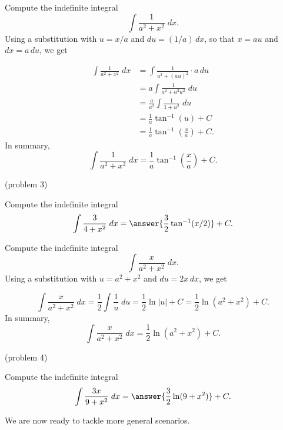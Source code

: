 \documentclass{ximera}
\begin{document}
\begin{example}[example 3]
Compute the indefinite integral
\[
\int \frac{1}{a^2 + x^2} \; dx.
\]
Using a substitution with $u = x/a$ and $du = (1/a) \, dx$, so that $x = au$ and $dx = a \, du$, we get

\begin{align*}
 \int \frac{1}{a^2 + x^2} \; dx &= \int \frac{1}{a^2 + (au)^2} \cdot a\, du   \\
 &= a\int \frac{1}{a^2 + a^2u^2} \; du   \\
 &= \frac{a}{a^2} \int \frac{1}{1+u^2} \; du \\
 &= \frac{1}{a} \tan^{-1}(u) + C \\
 &= \frac{1}{a} \tan^{-1}\left(\frac{x}{a}\right) + C.
 \end{align*}
 In summary,
 \[
\int \frac{1}{a^2 + x^2} \; dx =  \frac{1}{a} \tan^{-1}\left(\frac{x}{a}\right) + C.
\]
 \end{example}
 
 
 
 \begin{problem}(problem 3)
 
 Compute the indefinite integral
 \[
 \int \frac{3}{4+x^2} \; dx = \answer{\frac32 \tan^{-1}(x/2)} + C.
\]

 \end{problem}
 
 
 
 
\begin{example}[example 4]

Compute the indefinite integral
\[
\int \frac{x}{a^2 + x^2} \; dx.
\]
Using a substitution with $u = a^2 + x^2$ and $du = 2x \, dx$, we get

 \[
 \int \frac{x}{a^2 + x^2} \; dx = \frac12 \int \frac{1}{u} \; du   =  \frac{1}{2} \ln|u| + C =    
 \frac{1}{2} \ln(a^2 + x^2) + C.
 \]
 In summary,
 \[
\int \frac{x}{a^2 + x^2} \; dx =  \frac{1}{2}\ln(a^2 + x^2)  + C.
\]

\end{example}
 
 
 
 
\begin{problem}(problem 4)

Compute the indefinite integral
\[
 \int \frac{3x}{9+x^2} \; dx = \answer{\frac32 \ln(9+ x^2)} + C.
\]

\end{problem}
               
                    
We are now ready to tackle more general scenarios.
\end{document}

